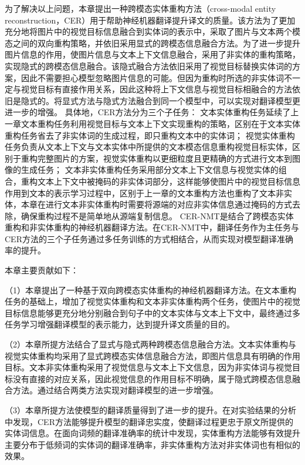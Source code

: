 为了解决以上问题，本章提出一种跨模态实体重构方法（cross-modal entity reconstruction，CER）用于帮助神经机器翻译提升译文的质量。该方法为了更加充分地将图片中的视觉目标信息融合到实体词的表示中，采取了图片与文本两个模态之间的双向重构策略，并依旧采用显式的跨模态信息融合方法。为了进一步提升图片信息的作用，使图片信息与文本上下文信息融合，采用了非实体的重构策略，实现隐式的跨模态信息融合。该隐式融合方法依旧采用了视觉目标替换实体词的方案，因此不需要担心模型忽略图片信息的可能。但因为重构时所选的非实体词不一定与视觉目标有直接作用关系，因此这种将上下文信息与视觉目标相融合的方法依旧是隐式的。将显式方法与隐式方法融合到同一个模型中，可以实现对翻译模型更进一步的增强。
具体地，CER方法分为三个子任务：
文本实体重构任务延续了上一章文本重构任务利用视觉目标与文本上下文实现重构的策略，区别在于文本实体重构任务省去了非实体词的生成过程，即只重构文本中的实体词；
视觉实体重构任务负责从文本上下文与文本实体中所提供的文本模态信息重构视觉目标实体，区别于重构完整图片的方案，视觉实体重构以更细粒度且更精确的方式进行文本到图像的生成任务；
文本非实体重构任务采用部分文本上下文信息与视觉实体的组合，重构文本上下文中被掩码的非实体词部分，这样能够使图片中的视觉目标信息作用到文本的表示学习过程中，区别于上一章的文本重构方法也重构了文本非实体，本章在进行文本非实体重构时需要将源端的对应非实体信息通过掩码的方式去除，确保重构过程不是简单地从源端复制信息。
CER-NMT是结合了跨模态实体重构和非实体重构的神经机器翻译方法。在CER-NMT中，翻译任务作为主任务与CER方法的三个子任务通过多任务训练的方式相结合，从而实现对模型翻译准确率的提升。

本章主要贡献如下：

（1）本章提出了一种基于双向跨模态实体重构的神经机器翻译方法。在文本重构任务的基础上，增加了视觉实体重构和文本非实体重构两个任务，使图片中的视觉目标信息能够更充分地分别融合到句子中的文本实体与文本上下文中，最终通过多任务学习增强翻译模型的表示能力，达到提升译文质量的目的。

（2）本章所提方法结合了显式与隐式两种跨模态信息融合方法。文本实体重构与视觉实体重构均采用了显式跨模态实体信息融合方法，即图片信息具有明确的作用目标。文本非实体重构采用了视觉信息与文本上下文信息，因为非实体词与视觉目标没有直接的对应关系，因此视觉信息的作用目标不明确，属于隐式跨模态信息融合方法。通过结合两类方法实现对翻译模型的进一步增强。

（3）本章所提方法使模型的翻译质量得到了进一步的提升。在对实验结果的分析中发现，CER方法能够提升模型的翻译忠实度，使翻译过程更忠于原文所提供的实体词信息。在面向词频的翻译准确率的统计中发现，实体重构方法能够有效提升主要分布于低频词的实体词的翻译准确率，非实体重构方法对非实体词也有相似的效果。